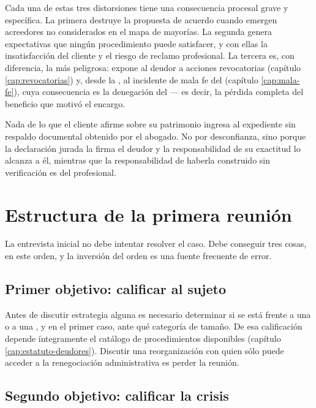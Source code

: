 Cada una de estas tres distorsiones tiene una consecuencia procesal grave y específica.
La primera destruye la propuesta de acuerdo cuando emergen acreedores no considerados en
el mapa de mayorías. La segunda genera expectativas que ningún procedimiento puede
satisfacer, y con ellas la insatisfacción del cliente y el riesgo de reclamo
profesional. La tercera es, con diferencia, la más peligrosa: expone al deudor a acciones
revocatorias (capítulo \ref{cap:revocatorias}) y, desde la \Lreforma{}, al incidente de
mala fe del  (capítulo \ref{cap:mala-fe}), cuya consecuencia es la denegación
del \discharge{} — es decir, la pérdida completa del beneficio que motivó el encargo.

\begin{foco}
Nada de lo que el cliente afirme sobre su patrimonio ingresa al expediente sin respaldo
documental obtenido por el abogado. No por desconfianza, sino porque la declaración
jurada la firma el deudor y la responsabilidad de su exactitud lo alcanza a él, mientras
que la responsabilidad de haberla construido sin verificación es del profesional.
\end{foco}

\section{Estructura de la primera reunión}

La entrevista inicial no debe intentar resolver el caso. Debe conseguir tres cosas, en
este orden, y la inversión del orden es una fuente frecuente de error.

\subsection{Primer objetivo: calificar al sujeto}

Antes de discutir estrategia alguna es necesario determinar si se está frente a una
\empresadeudora{} o a una \personadeudora{}, y en el primer caso, ante qué categoría de
tamaño. De esa calificación depende íntegramente el catálogo de procedimientos
disponibles (capítulo \ref{cap:estatuto-deudores}). Discutir una reorganización con quien
sólo puede acceder a la renegociación administrativa es perder la reunión.

\subsection{Segundo objetivo: calificar la crisis}

